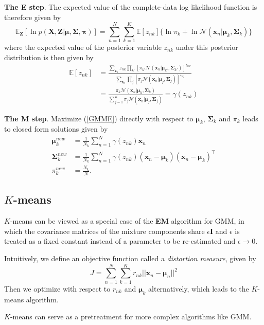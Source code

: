 \documentclass[a4paper]{book}
\renewcommand{\bf}{\mathbf}
\renewcommand{\cal}{\mathcal}
\newcommand{\bb}{\mathbb}
\newcommand{\imp}[1]{\textit{#1}}
\newcommand{\bs}{\boldsymbol}
\begin{document}
\textbf{The E step}. The expected value of the complete-data log likelihood function is therefore given by
\begin{equation}
	\bb{E}_{\bf{Z}}[\ln p(\bf{X,Z}|\bs{\mu,\Sigma,\pi})] = \sum_{n=1}^N \sum_{k=1}^K \bb{E}[z_{nk}]\{ \ln \pi_k + \ln \cal{N}(\bf{x}_n|\bs{\mu}_k,\bs{\Sigma}_k) \} \label{GMME}
\end{equation}
where the expected value of the posterior variable $z_{nk}$ under this posterior distribution is then given by
\begin{align}
	\bb{E}[z_{nk}] &= \frac{\sum_{\bf{z}_n} z_{nk}\prod_{k'}[ \pi_{k'} \cal{N}(\bf{x}_n|\bs{\mu}_{k'},\bs{\Sigma}_{k'})]^{z_{nk'}}}{\sum_{\bf{z}_n}\prod_j[\pi_j \cal{N}(\bf{x}_n|\bs{\mu}_j,\bs{\Sigma}_j)]^{z_{nj}}} \\
	&= \frac{\pi_k \cal{N}(\bf{x}_n|\bs{\mu}_k,\bs{\Sigma}_k)}{\sum_{j=1}^K \pi_j \cal{N}(\bf{x}_n|\bs{\mu}_j,\bs{\Sigma}_j)}=\gamma(z_{nk})
\end{align}

\textbf{The M step}. Maximize (\ref{GMME}) directly with respect to $\bs{\mu}_k$, $\bs{\Sigma}_k$ and $\pi_k$ leads to closed form solutions given by
\begin{align}
	\bs{\mu}_k^{new} &= \frac{1}{N_k} \sum_{n=1}^N \gamma(z_{nk})\bf{x}_n \\
	\bs{\Sigma}_k^{new} &= \frac{1}{N_k} \sum_{n=1}^N \gamma(z_{nk}) (\bf{x}_n - \bs{\mu}_k)(\bf{x}_n-\bs{\mu}_k)^{\intercal} \\
	\pi_k^{new} &= \frac{N_k}{N}.
\end{align}
\subsection{$K$-means}
$K$-means can be viewed as a special case of the \textbf{EM} algorithm for GMM, in which the covariance matrices of the mixture components share $\epsilon\bf{I}$ and $\epsilon$ is treated as a fixed constant instead of a parameter to be re-estimated and $\epsilon \rightarrow 0$. 

Intuitively, we define an objective function called a \imp{distortion measure}, given by
\begin{equation}
	J = \sum_{n=1}^N \sum_{k=1}^K r_{nk} || \bf{x}_n - \bs{\mu}_n||^2
\end{equation}
Then we optimize with respect to $r_{nk}$ and $\bs{\mu}_k$ alternatively, which leads to the $K$-means algorithm.

$K$-means can serve as a pretreatment for more complex algorithms like GMM.
\end{document}
